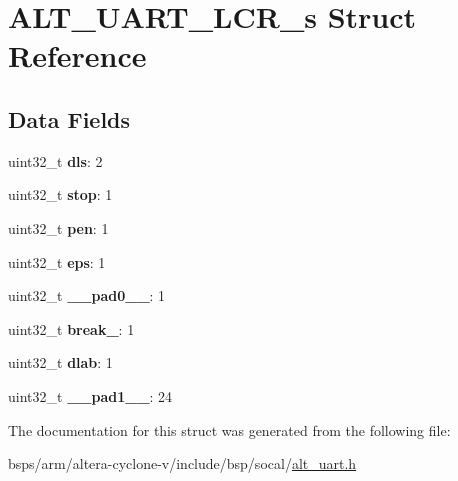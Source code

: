\hypertarget{structALT__UART__LCR__s}{}\section{A\+L\+T\+\_\+\+U\+A\+R\+T\+\_\+\+L\+C\+R\+\_\+s Struct Reference}
\label{structALT__UART__LCR__s}
\subsection*{Data Fields}
\begin{DoxyCompactItemize}
\item 
\mbox{\label{structALT__UART__LCR__s_ab608f7928127f4d1f6a7c68163b29b30}} 
uint32\+\_\+t {\bfseries dls}\+: 2
\item 
\mbox{\label{structALT__UART__LCR__s_a78bce37e1db6a49da44088c16e61e35a}} 
uint32\+\_\+t {\bfseries stop}\+: 1
\item 
\mbox{\label{structALT__UART__LCR__s_af22d48b4a6f322e0cf219daaee0a9ba6}} 
uint32\+\_\+t {\bfseries pen}\+: 1
\item 
\mbox{\label{structALT__UART__LCR__s_a0f3441515ccb16ca9d8673116e0498d9}} 
uint32\+\_\+t {\bfseries eps}\+: 1
\item 
\mbox{\label{structALT__UART__LCR__s_af94583dfa1ace318a5ed3fb33a643cec}} 
uint32\+\_\+t {\bfseries \+\_\+\+\_\+pad0\+\_\+\+\_\+}\+: 1
\item 
\mbox{\label{structALT__UART__LCR__s_ac6209c3307ff52756036d7ef96f83d6a}} 
uint32\+\_\+t {\bfseries break\+\_\+}\+: 1
\item 
\mbox{\label{structALT__UART__LCR__s_a93ec827e1189733134ffe1dc31e9f6ad}} 
uint32\+\_\+t {\bfseries dlab}\+: 1
\item 
\mbox{\label{structALT__UART__LCR__s_a009367dd3982005d170b8dcfe0b7774e}} 
uint32\+\_\+t {\bfseries \+\_\+\+\_\+pad1\+\_\+\+\_\+}\+: 24
\end{DoxyCompactItemize}


The documentation for this struct was generated from the following file\+:\begin{DoxyCompactItemize}
\item 
bsps/arm/altera-\/cyclone-\/v/include/bsp/socal/\mbox{\hyperlink{alt__uart_8h}{alt\+\_\+uart.\+h}}\end{DoxyCompactItemize}
